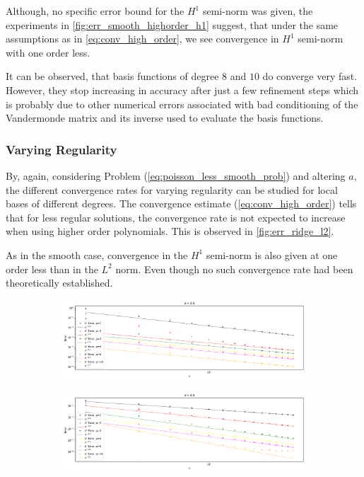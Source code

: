 \documentclass[11pt,a4paper]{article}
\begin{document}
\begin{multicols}{2}
Although, no specific error bound for the $H^1$ semi-norm was given, the experiments in \autoref{fig:err_smooth_highorder_h1} suggest,
that under the same assumptions as in \autoref{eq:conv_high_order}, we see convergence in $H^1$ semi-norm
with one order less.

It can be observed, that basis functions of degree $8$ and $10$ do converge very fast.
However, they stop increasing in accuracy after just a few refinement steps which is probably due to other numerical errors
associated with bad conditioning of the Vandermonde matrix and its inverse used to evaluate the basis functions.

\subsubsection*{Varying Regularity}
By, again, considering Problem (\ref{eq:poisson_less_smooth_prob}) and altering $a$, the different
convergence rates for varying regularity can be studied for local bases of different degrees.
The convergence estimate (\ref{eq:conv_high_order}) tells that for less regular solutions,
the convergence rate is not expected to increase when using higher order polynomials.
This is observed in \autoref{fig:err_ridge_l2}.


As in the smooth case, convergence in the $H^1$ semi-norm is also given at one order less than in the $L^2$ norm.
Even though no such convergence rate had been theoretically established.
\begin{figure}[H]
  \centering
  \begin{subfigure}{1\linewidth}
    \centering
    \includegraphics[width=.8\linewidth]{errors_ridge_26_l2}
  \end{subfigure}

  \begin{subfigure}{1\linewidth}
    \centering
    \includegraphics[width=.8\linewidth]{errors_ridge_36_l2}
  \end{subfigure}


\end{figure}
\end{multicols}
\end{document}
